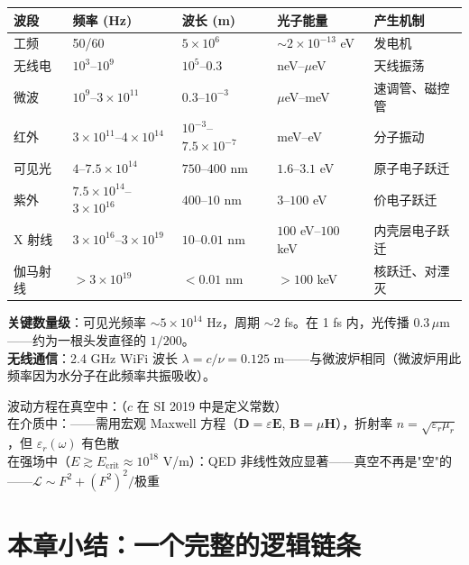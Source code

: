 \begin{oombox}
  \begin{center}
  \footnotesize
  \begin{tabular}{p{2.8cm}p{2.2cm}p{2.5cm}p{3.5cm}p{3cm}}
  \toprule
  \textbf{波段} & \textbf{频率 (Hz)} & \textbf{波长 (m)} & \textbf{光子能量} & \textbf{产生机制} \\
  \midrule
  工频 & 50/60 & $5\times10^6$ & $\sim 2\times10^{-13}$ eV & 发电机 \\
  无线电 & $10^3$--$10^9$ & $10^5$--$0.3$ & neV--$\mu$eV & 天线振荡 \\
  微波 & $10^9$--$3\times10^{11}$ & $0.3$--$10^{-3}$ & $\mu$eV--meV & 速调管、磁控管 \\
  红外 & $3\times10^{11}$--$4\times10^{14}$ & $10^{-3}$--$7.5\times10^{-7}$ & meV--eV & 分子振动 \\
  可见光 & $4$--$7.5\times10^{14}$ & $750$--$400$ nm & $1.6$--$3.1$ eV & 原子电子跃迁 \\
  紫外 & $7.5\times10^{14}$--$3\times10^{16}$ & $400$--$10$ nm & $3$--$100$ eV & 价电子跃迁 \\
  X 射线 & $3\times10^{16}$--$3\times10^{19}$ & $10$--$0.01$ nm & $100$ eV--$100$ keV & 内壳层电子跃迁 \\
  伽马射线 & $>3\times10^{19}$ & $<0.01$ nm & $>100$ keV & 核跃迁、对湮灭 \\
  \bottomrule
  \end{tabular}
  \end{center}
  \textbf{关键数量级}：可见光频率 $\sim 5\times10^{14}$ Hz，周期 $\sim 2$ fs。在 1 fs 内，光传播 $0.3\,\mu$m——约为一根头发直径的 $1/200$。\\
  \textbf{无线通信}：2.4 GHz WiFi 波长 $\lambda = c/\nu = 0.125$ m——与微波炉相同（微波炉用此频率因为水分子在此频率共振吸收）。
\end{oombox}

\precisionbox[电磁波方程精度]
  波动方程在真空中：\precexact（$c$ 在 SI 2019 中是定义常数）\\
  在介质中：\preceffective——需用宏观 Maxwell 方程（$\mathbf{D}=\varepsilon\mathbf{E}$, $\mathbf{B}=\mu\mathbf{H}$），折射率 $n=\sqrt{\varepsilon_r\mu_r}$，但 $\varepsilon_r(\omega)$ 有色散 \\
  在强场中（$E \gtrsim E_{\text{crit}} \approx 10^{18}$ V/m）：QED 非线性效应显著——真空不再是"空"的——$\mathcal{L} \sim F^2 + (F^2)^2/\text{极重}$
\endprecisionbox

\section{本章小结：一个完整的逻辑链条}

